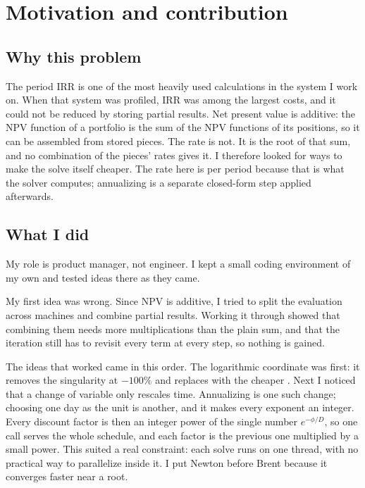 \providecommand{\todo}[1]{\textcolor{red!60!black}{\itshape [To write: #1]}}

\section{Motivation and contribution}\label{sec:author}

\subsection{Why this problem}
The period IRR is one of the most heavily used calculations in the system I work on. When that system was profiled, IRR was among the largest costs, and it could not be reduced by storing partial results. Net present value is additive: the NPV function of a portfolio is the sum of the NPV functions of its positions, so it can be assembled from stored pieces. The rate is not. It is the root of that sum, and no combination of the pieces' rates gives it. I therefore looked for ways to make the solve itself cheaper. The rate here is per period because that is what the solver computes; annualizing is a separate closed-form step applied afterwards.

\subsection{What I did}
My role is product manager, not engineer. I kept a small coding environment of my own and tested ideas there as they came.

My first idea was wrong. Since NPV is additive, I tried to split the evaluation across machines and combine partial results. Working it through showed that combining them needs more multiplications than the plain sum, and that the iteration still has to revisit every term at every step, so nothing is gained.

The ideas that worked came in this order. The logarithmic coordinate was first: it removes the singularity at $-100\%$ and replaces  with the cheaper . Next I noticed that a change of variable only rescales time. Annualizing is one such change; choosing one day as the unit is another, and it makes every exponent an integer. Every discount factor is then an integer power of the single number $e^{-\phi/D}$, so one  call serves the whole schedule, and each factor is the previous one multiplied by a small power. This suited a real constraint: each solve runs on one thread, with no practical way to parallelize inside it. I put Newton before Brent because it converges faster near a root.


